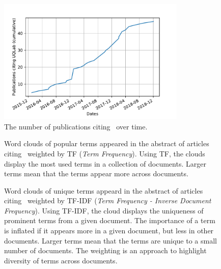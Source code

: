 \documentclass[11pt]{article}
\begin{document}
\begin{figure}[!ht]
  \centering
  \includegraphics[width=0.8\textwidth]{citing.pdf}
  \caption{The number of publications citing \uqlab~over time.}
  \label{fig:citing}
\end{figure}


\begin{figure}
\centering     %
{}
\caption{Word clouds of popular terms appeared in the abstract of articles citing \uqlab~weighted by TF (\emph{Term Frequency}). Using TF, the clouds display the most used terms in a collection of documents. Larger terms mean that the terms appear more across documents.}
\label{fig:citing_tf}
\end{figure}

\begin{figure}
\centering     %
{}
\caption{Word clouds of unique terms appeard in the abstract of articles citing \uqlab~weighted by TF-IDF (\emph{Term Frequency - Inverse Document Frequency}). Using TF-IDF, the cloud displays the uniqueness of prominent terms from a given document. The importance of a term is inflated if it appears more in a given document, but less in other documents. Larger terms mean that the terms are unique to a small number of documents. The weighting is an approach to highlight diversity of terms across documents.}
\label{fig:citing_tfidf}
\end{figure}
\end{document}
